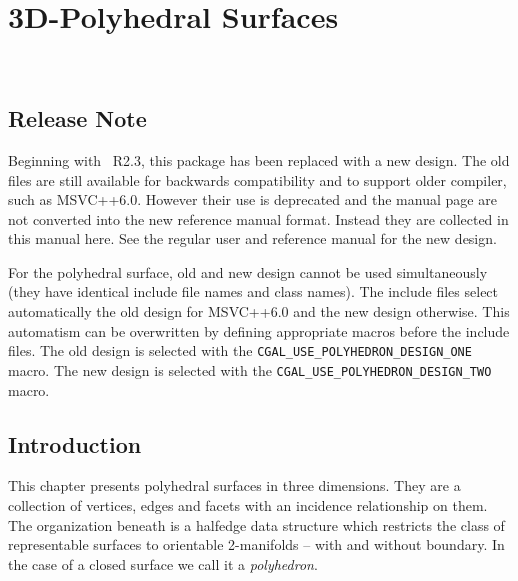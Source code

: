 
\ccParDims

\chapter{3D-Polyhedral Surfaces}
\label{chapterPolyhedron}
\\


\section{Release Note}

Beginning with \cgal\ R2.3, this package has been replaced with a new
design.  The old files are still available for backwards compatibility
and to support older compiler, such as MSVC++6.0. However their use is
deprecated and the manual page are not converted into the new
reference manual format. Instead they are collected in this manual
here. See the regular user and reference manual for the new design.

For the polyhedral surface, old and new design cannot be used
simultaneously (they have identical include file names and class
names). The include files select automatically the old design for
MSVC++6.0 and the new design otherwise. This automatism can be
overwritten by defining appropriate macros before the include
files. The old design is selected with the 
\texttt{CGAL\_USE\_POLYHEDRON\_DESIGN\_ONE} macro. The new design 
is selected with the 
\texttt{CGAL\_USE\_POLYHEDRON\_DESIGN\_TWO} macro.

\section{Introduction}

This chapter presents polyhedral surfaces in three dimensions. They
are a collection of vertices, edges and facets with an incidence
relationship on them. The organization beneath is a halfedge data
structure which restricts the class of representable surfaces to
orientable 2-manifolds -- with and without boundary. In the case of a
closed surface we call it a {\em polyhedron}.

